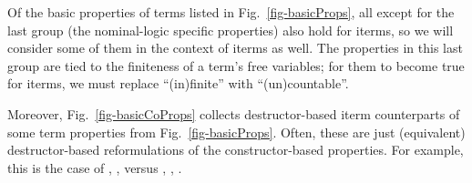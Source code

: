 Of the basic properties of terms listed in Fig.~\ref{fig-basicProps}, all except for the last group (the %
nominal-logic specific properties) also hold for iterms, so we will consider some of them in the context of iterms as well. %
The properties in this last group 
are tied to the finiteness of a term's free variables; %
for them %
to become true for iterms, 
we must replace ``(in)finite'' with ``(un)countable''. 
%
%

Moreover, 
Fig.~\ref{fig-basicCoProps} collects destructor-based iterm %
counterparts of some term properties from Fig.~\ref{fig-basicProps}.
%
Often, these are just (equivalent) destructor-based reformulations of the constructor-based properties. For example, this is the case of \ISwVr{}, \ISwAp{},  \ISwLm{} versus \SwVr{}, \SwAp{}, \SwLm{}.  


